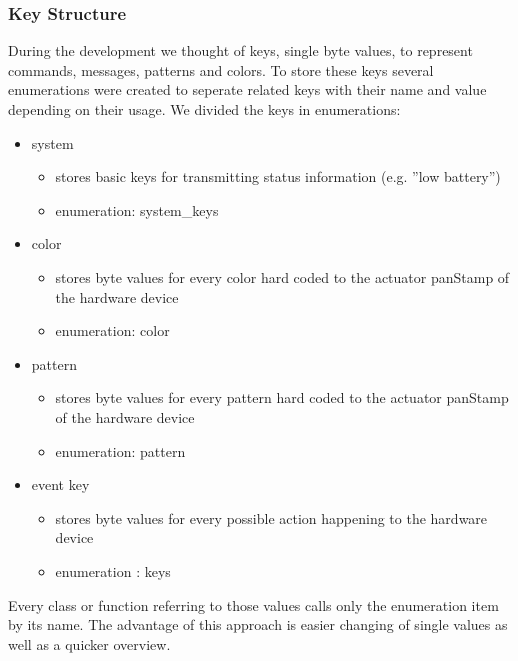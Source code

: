 \subsubsection{Key Structure}
During the development we thought of keys, single byte values, to represent commands, messages, patterns and colors. To store these keys several enumerations were created to seperate related keys with their name and value depending on their usage.
We divided the keys in enumerations:
\begin{itemize}
    \item system
    \begin{itemize}
         \item stores basic keys for transmitting status information (e.g. ''low battery'')
				 \item enumeration: system\_keys
    \end{itemize}
    \item color
    \begin{itemize}
        \item stores byte values for every color hard coded to the actuator panStamp of the hardware device
				\item enumeration: color
    \end{itemize}
    \item pattern
    \begin{itemize}
        \item stores byte values for every pattern hard coded to the actuator panStamp of the hardware device
				\item enumeration: pattern
    \end{itemize}
    \item event key
    \begin{itemize}
        \item stores byte values for every possible action happening to the hardware device
				\item enumeration : keys
    \end{itemize}
\end{itemize} 

Every class or function referring to those values calls only the enumeration item by its name. The advantage of this approach is easier changing of single values as well as a quicker overview.
